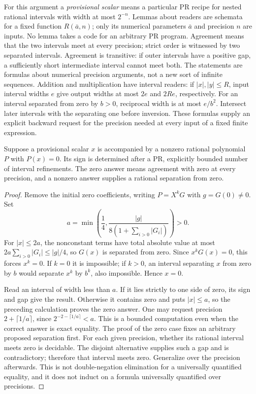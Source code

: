 For this argument a \emph{provisional scalar} means a particular PR
recipe for nested rational intervals with width at most $2^{-n}$.
Lemmas about readers are schemata for a fixed function $R(\bar a,n)$;
only its numerical parameters $\bar a$ and precision $n$ are inputs.
No lemma takes a code for an arbitrary PR program.
Agreement means that the two intervals meet at every precision; strict
order is witnessed by two separated intervals. Agreement is transitive:
if outer intervals have a positive gap, a sufficiently short intermediate
interval cannot meet both. The statements are formulas about numerical
precision arguments, not a new sort of infinite sequences.
Addition and multiplication have interval readers: if $|x|,|y|\le R$,
input interval widths $e$ give output widths at most $2e$ and $2Re$,
respectively. For an interval separated from zero by $b>0$, reciprocal
width is at most $e/b^2$. Intersect later intervals with the separating
one before inversion. These formulas supply an explicit backward request
for the precision needed at every input of a fixed finite expression.

\begin{lemma}\label{found:sign}
Suppose a provisional scalar $x$ is accompanied by a nonzero rational
polynomial $P$ with $P(x)=0$. Its sign is determined after a PR, explicitly
bounded number of interval refinements. The zero answer means agreement
with zero at every precision, and a nonzero answer supplies a rational
separation from zero.
\end{lemma}
\begin{proof}
Remove the initial zero coefficients, writing $P=X^kG$ with $g=G(0)\ne0$.
Set
\[
 a=\min\left(\frac14,\frac{|g|}{8(1+\sum_{i>0}|G_i|)}\right)>0.
\]
For $|x|\le2a$, the nonconstant terms have total absolute value at most
$2a\sum_{i>0}|G_i|\le |g|/4$, so $G(x)$ is separated from zero.
Since $x^kG(x)=0$, this forces $x^k=0$. If $k=0$ it is impossible;
if $k>0$, an interval separating $x$ from zero by $b$ would separate
$x^k$ by $b^k$, also impossible. Hence $x=0$.

Read an interval of width less than $a$. If it lies strictly to one side
of zero, its sign and gap give the result. Otherwise it contains zero
and puts $|x|\le a$, so the preceding calculation proves the zero answer.
One may request precision $2+\lceil1/a\rceil$, since
$2^{-2-\lceil1/a\rceil}<a$. This is a bounded computation even when
the correct answer is exact equality. The proof of the zero case fixes
an arbitrary proposed separation first. For each given precision, whether
its rational interval meets zero is decidable. The disjoint alternative
supplies such a gap and is contradictory; therefore that interval meets
zero. Generalize over the precision afterwards. This is not
double-negation elimination for a universally quantified equality, and
it does not induct on a formula universally quantified over precisions.
\end{proof}

